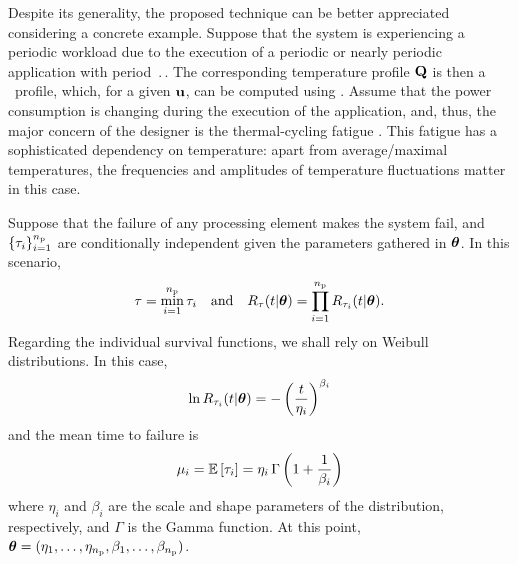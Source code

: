 Despite its generality, the proposed technique can be better appreciated considering a concrete example.
Suppose that the system is experiencing a periodic workload due to the execution of a periodic or nearly periodic application with period $\period$.
The corresponding temperature profile $\mathbf{Q}$ is then a \DSS\ profile, which, for a given $\mathbf{u}$, can be computed using .
Assume that the power consumption is changing during the execution of the application, and, thus, the major concern of the designer is the thermal-cycling fatigue \cite{jedec}.
This fatigue has a sophisticated dependency on temperature: apart from average/maximal temperatures, the frequencies and amplitudes of temperature fluctuations matter in this case.

Suppose that the failure of any processing element makes the system fail, and $\{ \tau_i \}_{i = 1}^{n_\text{p}}$ are conditionally independent given the parameters gathered in $\bm{\theta}$.
In this scenario,
\[
  \tau = \min_{i = 1}^{n_\text{p}} \tau_i \hspace{1em} \text{and} \hspace{1em} R_\tau(t | \bm{\theta}) = \prod_{i = 1}^{n_\text{p}} R_{\tau_i}(t | \bm{\theta}).
\]
Regarding the individual survival functions, we shall rely on Weibull distributions.
In this case,
\begin{equation} \elab{weibull-model}
  \ln \survival_{\T_i}(\t | \pvw) = -\left( \frac{\t}{\eta_i} \right)^{\beta_i}
\end{equation}
and the mean time to failure is
\begin{equation} \elab{weibull-expectation}
  \mu_i = \expectation{\T_i} = \eta_i \, \Gamma\left(1 + \frac{1}{\beta_i}\right)
\end{equation}
where $\eta_i$ and $\beta_i$ are the scale and shape parameters of the distribution, respectively, and $\Gamma$ is the Gamma function.
At this point, $\bm{\theta} = (\eta_1, \dotsc, \eta_{n_\text{p}}, \beta_1, \dotsc, \beta_{n_\text{p}})$.

